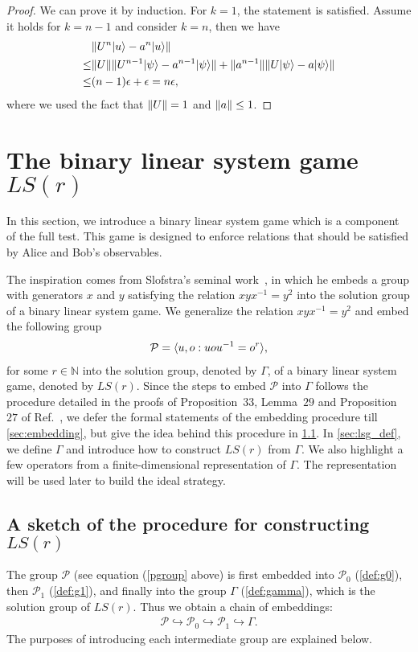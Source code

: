 \documentclass[11pt,letterpaper]{article}
\newcommand{\ket}[1]{|#1\rangle}
\DeclarePairedDelimiter{\norm}{\lVert}{\rVert}
\DeclarePairedDelimiter{\ip}{\langle}{\rangle}
\newcommand{\N}{\mathbb{N}}
\newcommand{\1}{\mathbb{1}}
\newcommand{\Pg}{\mathcal{P}}
\newcommand{\LS}{LS}
\newcommand{\ep}{\epsilon}
\theoremstyle{definition}
\begin{document}
\begin{proof}
	We can prove it by induction. 
	For $k=1$, the statement is satisfied.
	Assume it holds for $k = n-1$ and consider $k = n$, then we have
	\begin{align*}
		&\norm{U^n \ket{u} - a^n\ket{u}} \\
		\leq &\norm{U} \norm{U^{n-1} \ket{\psi} - a^{n-1}\ket{\psi}} + \norm{a^{n-1}}
		\norm{U\ket{\psi} - a \ket{\psi}}\\
		\leq &(n-1)\ep + \ep = n \ep,
	\end{align*}
	where we used the fact that $\norm{U} = 1$ and $\norm{a} \leq 1$.
\end{proof}

\section{The binary linear system game $\LS(r)$}
\label{sec:lsg}
In this section, we introduce a binary linear system game which is a component of the full test.
This game is designed to enforce relations that should be satisfied by 
Alice and Bob's observables. 

The inspiration comes from 
Slofstra's seminal work~\cite{slofstra2017}, in which he
embeds a group with generators $x$ and $y$ satisfying the relation $xyx^{-1}=y^2$
into the solution group of a binary linear system game.  
We generalize the relation $xyx^{-1} = y^2$ and embed the 
following group
\begin{align}
    \Pg = \ip{u,o:uou^{-1} = o^r},
\label{pgroup}
\end{align}
for some $r \in \N$ into the solution group, denoted by $\Gamma$, of a binary linear system game, denoted by $\LS(r)$.
Since the steps to embed $\Pg$ into $\Gamma$ follows the procedure detailed in the proofs of Proposition~$33$, Lemma~$29$ and
Proposition $27$ of Ref.~\cite{slofstra2017}, 
we defer the formal statements of the embedding procedure till \cref{sec:embedding},
but give the idea behind this procedure in \cref{sec:embed_idea}. 
In \cref{sec:lsg_def}, we define $\Gamma$ and introduce how to
construct $\LS(r)$ from $\Gamma$.
We also highlight a few operators from a finite-dimensional representation of $\Gamma$.
The representation will be used later to build the ideal strategy.

\subsection{A sketch of the procedure
for constructing $\LS ( r )$}
\label{sec:embed_idea}
The group $\Pg$ (see equation (\ref{pgroup} above) is first embedded into $\Pg_0$ (\cref{def:g0}), then $\Pg_1$ (\cref{def:g1}), and finally into the group $\Gamma$ (\cref{def:gamma}), which is the
solution group of $\LS ( r )$.  
Thus we obtain a chain of embeddings:
\begin{align}
\Pg \hookrightarrow \Pg_0 \hookrightarrow \Pg_1 \hookrightarrow
\Gamma.
\end{align}
The purposes of introducing each intermediate
group are explained below.
\end{document}
